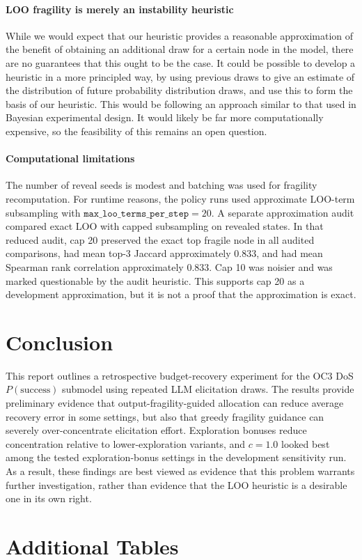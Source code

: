 \documentclass[11pt]{article}
\newcommand{\psuccess}{P(\text{success})}
\begin{document}
\paragraph{LOO fragility is merely an instability heuristic} While we would expect that our heuristic provides a reasonable approximation of the benefit of obtaining an additional draw for a certain node in the model, there are no guarantees that this ought to be the case. It could be possible to develop a heuristic in a more principled way, by using previous draws to give an estimate of the distribution of future probability distribution draws, and use this to form the basis of our heuristic. This would be following an approach similar to that used in Bayesian experimental design. It would likely be far more computationally expensive, so the feasibility of this remains an open question.

\paragraph{Computational limitations} The number of reveal seeds is modest and batching was used for fragility recomputation. For runtime reasons, the policy runs used approximate LOO-term subsampling with $\texttt{max\_loo\_terms\_per\_step}=20$. A separate approximation audit compared exact LOO with capped subsampling on revealed states. In that reduced audit, cap 20 preserved the exact top fragile node in all audited comparisons, had mean top-3 Jaccard approximately 0.833, and had mean Spearman rank correlation approximately 0.833. Cap 10 was noisier and was marked questionable by the audit heuristic. This supports cap 20 as a development approximation, but it is not a proof that the approximation is exact.

\section{Conclusion}
This report outlines a retrospective budget-recovery experiment for the OC3 DoS \(\psuccess\) submodel using repeated LLM elicitation draws. The results provide preliminary evidence that output-fragility-guided allocation can reduce average recovery error in some settings, but also that greedy fragility guidance can severely over-concentrate elicitation effort. Exploration bonuses reduce concentration relative to lower-exploration variants, and \(c=1.0\) looked best among the tested exploration-bonus settings in the development sensitivity run. As a result, these findings are best viewed as evidence that this problem warrants further investigation, rather than evidence that the LOO heuristic is a desirable one in its own right.

\printbibliography

\appendix

\section{Additional Tables}
\label{app:additional-tables}




\end{document}

